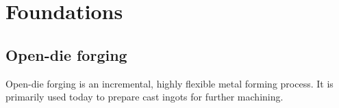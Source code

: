 \section{Foundations}

\subsection{Open-die forging}
Open-die forging is an incremental, highly flexible metal forming process. It is primarily used today to prepare cast ingots for further machining. 

